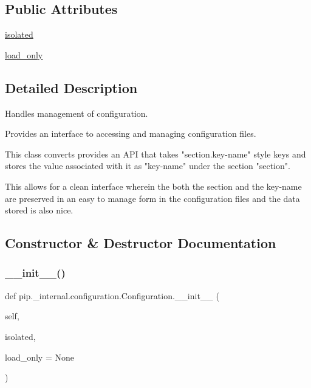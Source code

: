 \subsection*{Public Attributes}
\begin{DoxyCompactItemize}
\item 
\hyperlink{classpip_1_1__internal_1_1configuration_1_1Configuration_af5ff122437dd1ea056a28fc102c1149b}{isolated}
\item 
\hyperlink{classpip_1_1__internal_1_1configuration_1_1Configuration_a12c133cf8e1ac8bd7438014a7fd26dc7}{load\+\_\+only}
\end{DoxyCompactItemize}


\subsection{Detailed Description}
\begin{DoxyVerb}Handles management of configuration.

Provides an interface to accessing and managing configuration files.

This class converts provides an API that takes "section.key-name" style
keys and stores the value associated with it as "key-name" under the
section "section".

This allows for a clean interface wherein the both the section and the
key-name are preserved in an easy to manage form in the configuration files
and the data stored is also nice.
\end{DoxyVerb}
 

\subsection{Constructor \& Destructor Documentation}
\mbox{\label{classpip_1_1__internal_1_1configuration_1_1Configuration_a440aab98218a2ba8c937e6714f7e83e2}} 
\subsubsection{\texorpdfstring{\+\_\+\+\_\+init\+\_\+\+\_\+()}{\_\_init\_\_()}}
{\footnotesize\ttfamily def pip.\+\_\+internal.\+configuration.\+Configuration.\+\_\+\+\_\+init\+\_\+\+\_\+ (\begin{DoxyParamCaption}\item[{}]{self,  }\item[{}]{isolated,  }\item[{}]{load\+\_\+only = {\ttfamily None} }\end{DoxyParamCaption})}



